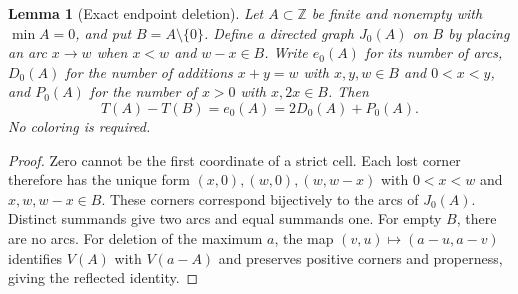 \documentclass[11pt,a4paper]{article}
\newtheorem{lemma}[theorem]{Lemma}
\theoremstyle{definition}
\newcommand{\Z}{\mathbb Z}
\numberwithin{equation}{section}
\begin{document}
\begin{lemma}[Exact endpoint deletion]\label{lem:deletion}
Let $A\subset\Z$ be finite and nonempty with $\min A=0$, and put $B=A\setminus\{0\}$. Define a directed graph $J_0(A)$ on $B$ by placing an arc $x\to w$ when $x<w$ and $w-x\in B$. Write $e_0(A)$ for its number of arcs, $D_0(A)$ for the number of additions $x+y=w$ with $x,y,w\in B$ and $0<x<y$, and $P_0(A)$ for the number of $x>0$ with $x,2x\in B$. Then
\begin{equation}\label{eq:endpoint-deletion}
T(A)-T(B)=e_0(A)=2D_0(A)+P_0(A).
\end{equation}
No coloring is required.
\end{lemma}
\begin{proof}
Zero cannot be the first coordinate of a strict cell. Each lost corner therefore has the unique form $(x,0),(w,0),(w,w-x)$ with $0<x<w$ and $x,w,w-x\in B$. These corners correspond bijectively to the arcs of $J_0(A)$. Distinct summands give two arcs and equal summands one. For empty $B$, there are no arcs. For deletion of the maximum $a$, the map $(v,u)\mapsto(a-u,a-v)$ identifies $V(A)$ with $V(a-A)$ and preserves positive corners and properness, giving the reflected identity.
\end{proof}
\end{document}
